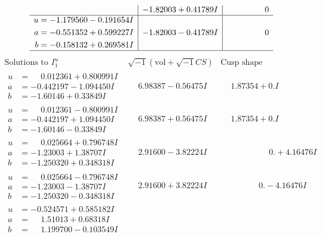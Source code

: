 \documentclass[1p]{elsarticle_modified}
\theoremstyle{definition}
\newcommand{\I}{\sqrt{-1}}
\begin{document}
$$\begin{array}{c|c|c}
 & -1.82003 + 0.41789 I & \phantom{-0.000000 } 0 \\ \hline\begin{aligned}
u &= -1.179560 - 0.191654 I \\
a &= -0.551352 + 0.599227 I \\
b &= -0.158132 + 0.269581 I\end{aligned}
 & -1.82003 - 0.41789 I & \phantom{-0.000000 } 0\\
 \hline 
 \end{array}$$\newpage$$\begin{array}{c|c|c}  
\text{Solutions to }I^u_{1}& \I (\text{vol} + \sqrt{-1}CS) & \text{Cusp shape}\\
 \hline 
\begin{aligned}
u &= \phantom{-}0.012361 + 0.800991 I \\
a &= -0.442197 - 1.094450 I \\
b &= -1.60146 + 0.33849 I\end{aligned}
 & \phantom{-}6.98387 - 0.56475 I & \phantom{-}1.87354 + 0. I\phantom{ +0.000000I} \\ \hline\begin{aligned}
u &= \phantom{-}0.012361 - 0.800991 I \\
a &= -0.442197 + 1.094450 I \\
b &= -1.60146 - 0.33849 I\end{aligned}
 & \phantom{-}6.98387 + 0.56475 I & \phantom{-}1.87354 + 0. I\phantom{ +0.000000I} \\ \hline\begin{aligned}
u &= \phantom{-}0.025664 + 0.796748 I \\
a &= -1.23003 + 1.38707 I \\
b &= -1.250320 + 0.348318 I\end{aligned}
 & \phantom{-}2.91600 - 3.82224 I & \phantom{-0.000000 -}0. + 4.16476 I \\ \hline\begin{aligned}
u &= \phantom{-}0.025664 - 0.796748 I \\
a &= -1.23003 - 1.38707 I \\
b &= -1.250320 - 0.348318 I\end{aligned}
 & \phantom{-}2.91600 + 3.82224 I & \phantom{-0.000000 } 0. - 4.16476 I \\ \hline\begin{aligned}
u &= -0.524571 + 0.585182 I \\
a &= \phantom{-}1.51013 + 0.68318 I \\
b &= \phantom{-}1.199700 - 0.103549 I\end{aligned}

\end{array}$$
\end{document}
